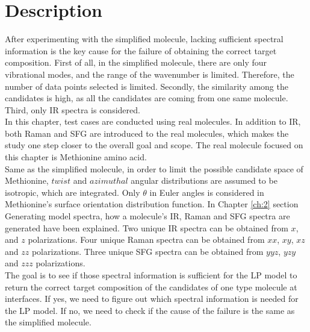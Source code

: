  \label{ch:4}
\section{Description}

After experimenting with the simplified molecule, lacking sufficient spectral information is the key cause for the failure of obtaining the correct target composition. First of all, in the simplified molecule, there are only four vibrational modes, and the range of the wavenumber is limited. Therefore, the number of data points selected is limited. Secondly, the similarity among the candidates is high, as all the candidates are coming from one same molecule.  Third, only IR spectra is considered. \\

In this chapter, test cases are conducted using real molecules. In addition to IR, both Raman and SFG are introduced to the real molecules, which makes the study one step closer to the overall goal and scope. The real molecule focused on this chapter is Methionine amino acid. \\

Same as the simplified molecule, in order to limit the possible candidate space of Methionine, $twist$ and $azimuthal$ angular distributions are assumed to be isotropic, which are integrated. Only $\theta$ in Euler angles is considered in Methionine's surface orientation distribution function. In Chapter \ref{ch:2} section Generating model spectra, how a molecule's IR, Raman and SFG spectra are generated have been explained. Two unique IR spectra can be obtained from $x$, and $z$ polarizations. Four unique Raman spectra can be obtained from $xx$, $xy$, $xz$ and $zz$ polarizations. Three unique SFG spectra can be obtained from $yyz$, $yzy$ and $zzz$ polarizations.\\

The goal is to see if those spectral information is sufficient for the LP model to return the correct target composition of the candidates of one type molecule at interfaces. If yes, we need to figure out which spectral information is needed for the LP model. If no, we need to check if the cause of the failure is the same as the simplified molecule. \\

